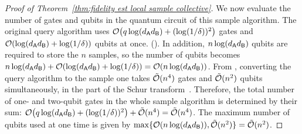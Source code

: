 \begin{proof}[Proof of Theorem~\ref{thm:fidelity est local sample collective}]
We now evaluate the number of gates and qubits in the quantum circuit of this sample algorithm.
The original query algorithm uses ${\mathcal{O}}\big(q\log(d_{\mathsf{A}} d_{\mathsf{B}}) + (\log(1/\delta))^2\big)$ gates and ${\mathcal{O}}(\log(d_{\mathsf{A}} d_{\mathsf{B}}) + \log(1/\delta))$ qubits at once. (). 
In addition, $n\log(d_{\mathsf{A}} d_{\mathsf{B}})$ qubits are required to store the $n$ samples, so the number of qubits becomes $n\log(d_{\mathsf{A}} d_{\mathsf{B}}) + {\mathcal{O}}(\log(d_{\mathsf{A}} d_{\mathsf{B}}) + \log(1/\delta)) = {\mathcal{O}}(n\log(d_{\mathsf{A}} d_{\mathsf{B}}))$.
From , converting the query algorithm to the sample one takes $\tilde{{\mathcal{O}}}(n^4)$ gates and $\tilde{{\mathcal{O}}}(n^2)$ qubits simultaneously, in the part of the Schur transform~\cite{burchardt2025highdimensionalschur}.
Therefore, the total number of one- and two-qubit gates in the whole sample algorithm is determined by their sum: ${\mathcal{O}}\big(q\log(d_{\mathsf{A}} d_{\mathsf{B}}) + (\log(1/\delta))^2\big) + \tilde{{\mathcal{O}}}(n^4) = \tilde{{\mathcal{O}}}(n^4)$.
The maximum number of qubits used at one time is given by $\max\{{\mathcal{O}}(n\log(d_{\mathsf{A}} d_{\mathsf{B}})), \tilde{{\mathcal{O}}}(n^2)\} = \tilde{{\mathcal{O}}}(n^2)$.





\end{proof}





